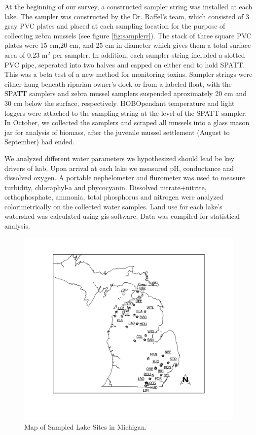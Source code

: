 At the beginning of our survey, a constructed sampler string was installed at each lake. The sampler was constructed by the Dr. Raffel's team, which consisted of 3 gray PVC plates and placed at each sampling location for the purpose of collecting zebra mussels (see figure \ref{fig:samplerr}). The stack of three square PVC plates were  15 cm,20 cm, and 25 cm in diameter which gives them a total surface area of 0.23 m$^2$ per sampler. In addition, each sampler string included a slotted PVC pipe, seperated into two halves and capped on either end to hold SPATT. This was a beta test of a new method for monitoring toxins. Sampler strings were either hung beneath riparian owner's dock or from a labeled float, with the SPATT samplers and zebra mussel samplers suspended aproximately 20 cm and 30 cm below the surface, respectively. HOBO\texttrademark pendant temperature and light loggers were attached to the sampling string at the level of the SPATT sampler. In October, we collected the samplers and scraped all mussels into a glass mason jar for analysis of biomass, after the juvenile mussel settlement (August to September) had ended.

We analyzed different water parameters we hypothesized should lead be key drivers of \gls{hab}. Upon arrival at each lake we measured pH, conductance and dissolved oxygen. A portable nephelometer and flurometer was used to measure turbidity, chloraphyl-a and phycocyanin. Dissolved nitrate+nitrite, orthophosphate, ammonia, total phosphorus and nitrogen were analyzed colorimetrically on the collected water samples. Land use for each lake's watershed was calculated using \gls{gis} software. Data was compiled for statistical analysis.

\begin{figure}[!h]
\includegraphics[width=\textwidth]{figures/Overview}
\caption{Map of Sampled Lake Sites in Michigan.}
\label{fig:overview}
\end{figure}

